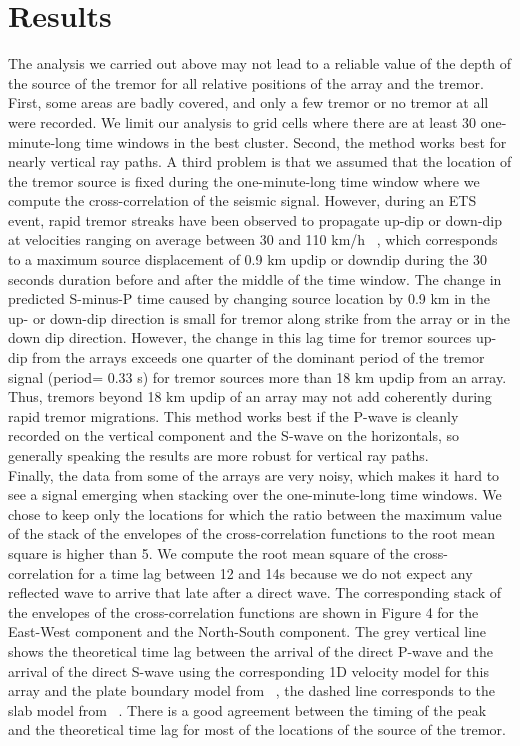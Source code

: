 \documentclass[draft]{agujournal2019}
\begin{document}
\section{Results}

The analysis we carried out above may not lead to a reliable value of the depth of the source of the tremor for all relative positions of the array and the tremor. First, some areas are badly covered, and only a few tremor or no tremor at all were recorded. We limit our analysis to grid cells where there are at least 30 one-minute-long time windows in the best cluster. Second, the method works best for nearly vertical ray paths. A third problem is that we assumed that the location of the tremor source is fixed during the one-minute-long time window where we compute the cross-correlation of the seismic signal. However, during an ETS event, rapid tremor streaks have been observed to propagate up-dip or down-dip at velocities ranging on average between 30 and 110 km/h ~\cite{GHO_2010_G3}, which corresponds to a maximum source displacement of 0.9 km updip or downdip during the 30 seconds duration before and after the middle of the time window. The change in predicted S-minus-P time caused by changing source location by 0.9 km in the up- or down-dip direction is small for tremor along strike from the array or in the down dip direction.  However, the change in this lag time for tremor sources up-dip from the arrays exceeds one quarter of the dominant period of the tremor signal (period= 0.33 s) for tremor sources more than 18 km updip from an array. Thus, tremors beyond 18 km updip of an array may not add coherently during rapid tremor migrations. This method works best if the P-wave is cleanly recorded on the vertical component and the S-wave on the horizontals, so generally speaking the results are more robust for vertical ray paths. \\

Finally, the data from some of the arrays are very noisy, which makes it hard to see a signal emerging when stacking over the one-minute-long time windows. We chose to keep only the locations for which the ratio between the maximum value of the stack of the envelopes of the cross-correlation functions to the root mean square is higher than 5. We compute the root mean square of the cross-correlation for a time lag between 12 and 14s because we do not expect any reflected wave to arrive that late after a direct wave. The corresponding stack of the envelopes of the cross-correlation functions are shown in Figure 4 for the East-West component and the North-South component. The grey vertical line shows the theoretical time lag between the arrival of the direct P-wave and the arrival of the direct S-wave using the corresponding 1D velocity model for this array and the plate boundary model from ~, the dashed line corresponds to the slab model from ~. There is a good agreement between the timing of the peak and the theoretical time lag for most of the locations of the source of the tremor.
\end{document}
